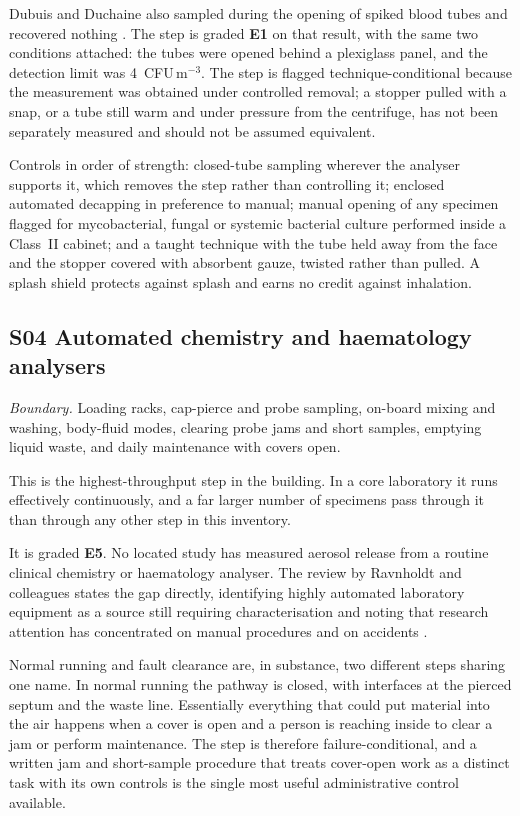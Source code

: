 Dubuis and Duchaine also sampled during the opening of spiked blood tubes and
recovered nothing \cite{dubuis2021}. The step is graded \textbf{E1} on that
result, with the same two conditions attached: the tubes were opened behind a
plexiglass panel, and the detection limit was 4~CFU\,m$^{-3}$. The step is
flagged technique-conditional because the measurement was obtained under
controlled removal; a stopper pulled with a snap, or a tube still warm and
under pressure from the centrifuge, has not been separately measured and should
not be assumed equivalent.

Controls in order of strength: closed-tube sampling wherever the analyser
supports it, which removes the step rather than controlling it; enclosed
automated decapping in preference to manual; manual opening of any specimen
flagged for mycobacterial, fungal or systemic bacterial culture performed
inside a Class~II cabinet; and a taught technique with the tube held away from
the face and the stopper covered with absorbent gauze, twisted rather than
pulled. A splash shield protects against splash and earns no credit against
inhalation.

\subsection{S04 Automated chemistry and haematology analysers}

\textit{Boundary.} Loading racks, cap-pierce and probe sampling, on-board
mixing and washing, body-fluid modes, clearing probe jams and short samples,
emptying liquid waste, and daily maintenance with covers open.

This is the highest-throughput step in the building. In a core laboratory it
runs effectively continuously, and a far larger number of specimens pass
through it than through any other step in this inventory.

It is graded \textbf{E5}. No located study has measured aerosol release from a
routine clinical chemistry or haematology analyser. The review by Ravnholdt and
colleagues states the gap directly, identifying highly automated laboratory
equipment as a source still requiring characterisation and noting that research
attention has concentrated on manual procedures and on accidents
\cite{ravnholdt2025}.

Normal running and fault clearance are, in substance, two different steps
sharing one name. In normal running the pathway is closed, with interfaces at
the pierced septum and the waste line. Essentially everything that could put
material into the air happens when a cover is open and a person is reaching
inside to clear a jam or perform maintenance. The step is therefore
failure-conditional, and a written jam and short-sample procedure that treats
cover-open work as a distinct task with its own controls is the single most
useful administrative control available.

